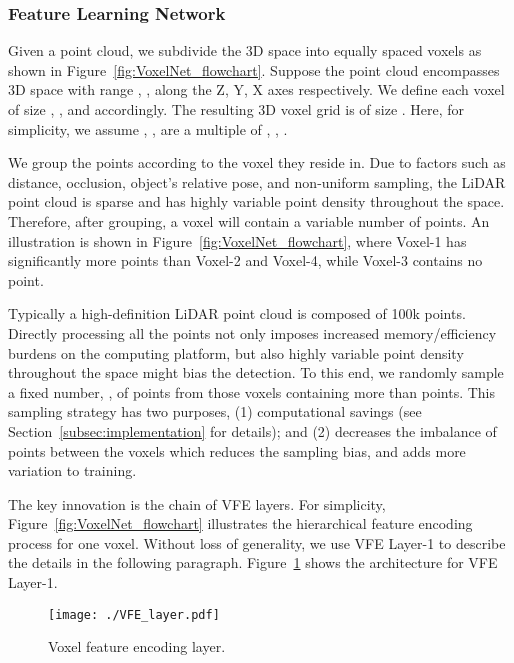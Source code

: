 \documentclass[10pt,twocolumn,letterpaper]{article}
\begin{document}
\subsubsection{Feature Learning Network}
\label{subsec:Feature_Learning}
 Given a point cloud, we subdivide the 3D space into equally spaced voxels as shown in Figure~\ref{fig:VoxelNet_flowchart}. Suppose the point cloud encompasses 3D space with range , ,  along the Z, Y, X axes respectively. We define each voxel of size , , and  accordingly. The resulting 3D voxel grid is of size . Here, for simplicity, we assume , ,  are a multiple of  , , . 

 We group the points according to the voxel they reside in. Due to factors such as distance, occlusion, object's relative pose, and non-uniform sampling, the LiDAR point cloud is sparse and has highly variable point density throughout the space. Therefore, after grouping, a voxel will contain a variable number of points. An illustration is shown in Figure~\ref{fig:VoxelNet_flowchart}, where Voxel-1 has significantly more points than Voxel-2 and Voxel-4, while Voxel-3  contains no point. 


 Typically a high-definition LiDAR point cloud is composed of 100k points. Directly processing all the points not only imposes increased memory/efficiency burdens on the computing platform, but also highly variable point density throughout the space might bias the detection. To this end, we  randomly sample a fixed number, , of points from those voxels containing more than  points. This sampling strategy has two purposes, (1) computational savings (see Section~\ref{subsec:implementation} for details); and (2) decreases the imbalance of points between the voxels which reduces the sampling bias, and adds more variation to training.




 The key innovation is the chain of VFE  layers. For simplicity, Figure~\ref{fig:VoxelNet_flowchart} illustrates the hierarchical feature encoding process for one voxel. Without loss of generality, we use VFE Layer-1 to describe the details in the following paragraph. Figure~\ref{fig:VFE} shows the architecture for VFE Layer-1. 

\begin{figure}[!t]
\centering
    \texttt{[image: ./VFE\_layer.pdf]}
      \vspace{-0.3cm}
\caption{Voxel feature encoding layer.}
\label{fig:VFE}
\end{figure}
\end{document}

